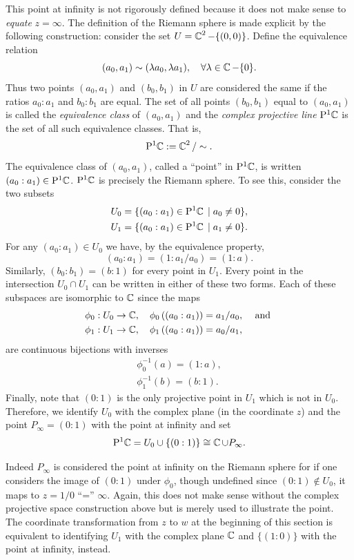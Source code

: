 This point at infinity is not rigorously defined because it does not make sense
to {\it equate} $z=\infty$. The definition of the Riemann sphere is made
explicit by the following construction: consider the set $U = \operatorname{\mathbb{C}}^2 -
\{(0,0)\}$. Define the equivalence relation
\[
  (a_0, a_1) \sim (\lambda a_0, \lambda a_1), \quad \forall \lambda \in \operatorname{\mathbb{C}} -
  \{0\}.
\]
Thus two points $(a_0,a_1)$ and $(b_0,b_1)$ in $U$ are considered the same if
the ratios $a_0 : a_1$ and $b_0 : b_1$ are equal. The set of all points
$(b_0,b_1)$ equal to $(a_0,a_1)$ is called the {\it equivalence class} of
$(a_0,a_1)$ and the {\it complex projective line} $\mathrm{P}^1 \!\operatorname{\mathbb{C}}$ is the set of all
such equivalence classes. That is,
\[
  \mathrm{P}^1 \!\operatorname{\mathbb{C}} := \operatorname{\mathbb{C}}^2 / \sim.
\]
The equivalence class of $(a_0,a_1)$, called a ``point'' in $\mathrm{P}^1 \!\operatorname{\mathbb{C}}$, is
written $(a_0 : a_1) \in \mathrm{P}^1 \!\operatorname{\mathbb{C}}$. $\mathrm{P}^1 \!\operatorname{\mathbb{C}}$ is precisely the Riemann
sphere. To see this, consider the two subsets
\begin{align*}
  U_0 &= \{ (a_0 : a_1) \in \mathrm{P}^1 \!\operatorname{\mathbb{C}} \; | \; a_0 \neq 0 \}, \\
  U_1 &= \{ (a_0 : a_1) \in \mathrm{P}^1 \!\operatorname{\mathbb{C}} \; | \; a_1 \neq 0 \}.
\end{align*}
For any $(a_0 : a_1) \in U_0$ we have, by the equivalence property,
\[
  (a_0 : a_1) = (1 : a_1/a_0) = (1 : a).
\]
Similarly, $(b_0 : b_1) = (b : 1)$ for every point in $U_1$. Every point in the
intersection $U_0 \cap U_1$ can be written in either of these two forms. Each of
these subspaces are isomorphic to $\operatorname{\mathbb{C}}$ since the maps
\begin{align*}
  \phi_0 : U_0 \to \operatorname{\mathbb{C}},
  \quad
  \phi_0 \left( (a_0 : a_1) \right) = a_1 / a_0,
  & \quad \text{ and } \\
  \phi_1 : U_1 \to \operatorname{\mathbb{C}},
  \quad
  \phi_1 \left( (a_0 : a_1) \right) = a_0 / a_1, &
\end{align*}
are continuous bijections with inverses
\begin{gather}
  \phi^{-1}_0(a) = (1 : a), \\
  \phi^{-1}_1(b) = (b : 1).
\end{gather}
Finally, note that $(0 : 1)$ is the only projective point in $U_1$ which is not
in $U_0$. Therefore, we identify $U_0$ with the complex plane (in the coordinate
$z$) and the point $P_\infty = (0 : 1)$ with the point at infinity and set
\begin{equation} \label{eqn: projective-line}
  \mathrm{P}^1 \!\operatorname{\mathbb{C}} = U_0 \cup \{ (0 : 1) \} \cong \operatorname{\mathbb{C}} \cup P_\infty.
\end{equation}

Indeed $P_\infty$ is considered the point at infinity on the Riemann sphere for
if one considers the image of $(0 : 1)$ under $\phi_0$, though undefined since
$(0:1) \not \in U_0$, it maps to $z = 1 / 0$ ``='' $\infty$. Again, this does
not make sense without the complex projective space construction above but is
merely used to illustrate the point. The coordinate transformation from $z$ to
$w$ at the beginning of this section is equivalent to identifying $U_1$ with the
complex plane $\operatorname{\mathbb{C}}$ and $\{(1 : 0)\}$ with the point at infinity, instead.

